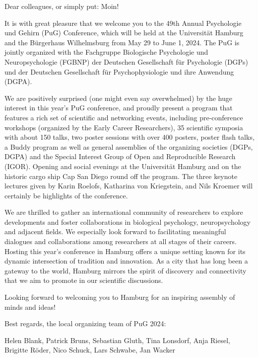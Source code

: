 Dear colleagues, or simply put: Moin!
 
It is with great pleasure that we welcome you to the 49th Annual Psychologie und Gehirn (PuG) Conference, which will be held at the Universität Hamburg and the Bürgerhaus Wilhelmsburg from May 29 to June 1, 2024. The PuG is jointly organized with the Fachgruppe Biologische Psychologie und Neuropsychologie (FGBNP) der Deutschen Gesellschaft für Psychologie  (DGPs) und der Deutschen Gesellschaft für Psychophysiologie und ihre Anwendung (DGPA).
 
We are positively surprised (one might even say overwhelmed) by the huge interest in this year’s PuG conference, and proudly present a program that features a rich set of scientific and networking events, including pre-conference workshops (organized by the Early Career Researchers), 35 scientific symposia with about 150 talks, two poster sessions with over 400 posters, poster flash talks, a Buddy program as well as general assemblies of the organizing societies (DGPs, DGPA) and the Special Interest Group of Open and Reproducible Research (IGOR). Opening and social evenings at the Universität Hamburg and on the historic cargo ship Cap San Diego round off the program. The three keynote lectures given by Karin Roelofs, Katharina von Kriegstein, and Nils Kroemer will certainly be highlights of the conference.
 
We are thrilled to gather an international community of researchers to explore developments and foster collaborations in biological psychology, neuropsychology and adjacent fields. We especially look forward to facilitating meaningful dialogues and collaborations among researchers at all stages of their careers. Hosting this year's conference in Hamburg offers a unique setting known for its dynamic intersection of tradition and innovation. As a city that has long been a gateway to the world, Hamburg mirrors the spirit of discovery and connectivity that we aim to promote in our scientific discussions.
 
Looking forward to welcoming you to Hamburg for an inspiring assembly of minds and ideas!
 
Best regards, the local organizing team of PuG 2024:

Helen Blank, Patrick Bruns, Sebastian Gluth, Tina Lonsdorf, Anja Riesel, Brigitte Röder, Nico Schuck, Lars Schwabe, Jan Wacker

\newpage